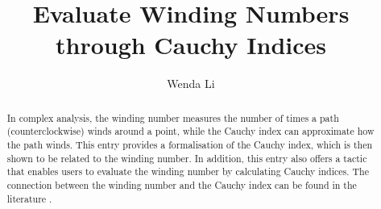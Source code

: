 \documentclass[11pt,a4paper]{article}
\begin{document}
\title{Evaluate Winding Numbers through Cauchy Indices}
\author{Wenda Li}
\maketitle

\begin{abstract}
	In complex analysis, the winding number measures the number of times a path (counterclockwise) winds around a point, while the Cauchy index can approximate how the path winds. This entry provides a formalisation of the Cauchy index, which is then shown to be related to the winding number. In addition, this entry also offers a tactic that enables users to evaluate the winding number by calculating Cauchy indices. The connection between the winding number and the Cauchy index can be found in the literature \cite{eisermann2012fundamental} \cite[Chapter 11]{rahman2002analytic}.
\end{abstract}






\end{document}
